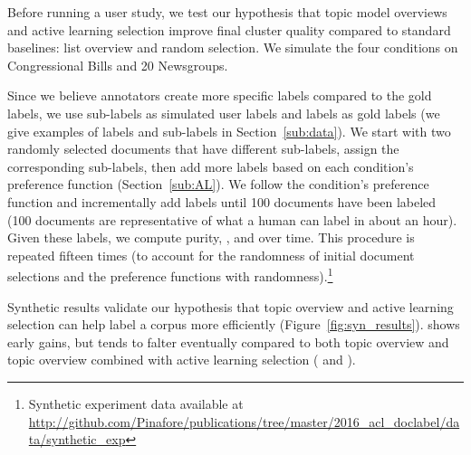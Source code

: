 
 

Before running a user study, we test our hypothesis that topic
model overviews and active learning selection improve final cluster quality compared to standard baselines: list overview and random
selection. We simulate the four conditions on Congressional
Bills and 20 Newsgroups.

Since we believe annotators create more specific labels compared to the gold
labels, we use sub-labels as simulated user labels and labels as gold labels (we
give examples of labels and sub-labels in Section~\ref{sub:data}). We start with
two randomly selected documents that have different sub-labels, assign the
corresponding sub-labels, then add more labels based on each condition's
preference function (Section~\ref{sub:AL}).  We follow the condition's
preference function and incrementally add labels until 100 documents have been
labeled (100 documents are representative of what a human can label in about an
hour).  Given these labels, we compute purity, , and  over
time. This procedure is repeated fifteen times (to account for the randomness of
initial document selections and the preference functions with
randomness).\footnote{Synthetic experiment data available at
\let\hyper@linkurl\saved@hyper@linkurl
  \url{http://github.com/Pinafore/publications/tree/master/2016_acl_doclabel/data/synthetic_exp}
  \NoHyper
  }

Synthetic results validate our hypothesis that topic overview and active learning selection can help label a corpus more efficiently
(Figure~\ref{fig:syn_results}).   shows early gains, but
tends to falter eventually compared to both topic overview and topic overview  combined with active learning selection ( and ).

